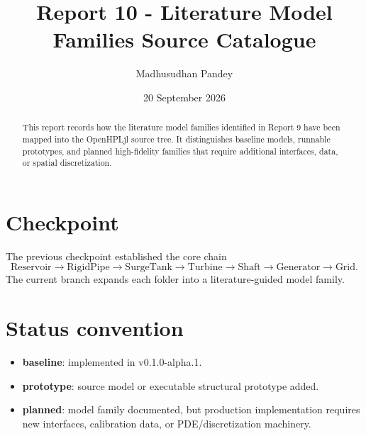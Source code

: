 \documentclass[10pt,a4paper]{article}
\title{Report 10 - Literature Model Families Source Catalogue}
\author{Madhusudhan Pandey}
\date{20 September 2026}
\begin{document}
\maketitle

\begin{abstract}
This report records how the literature model families identified in Report 9
have been mapped into the OpenHPLjl source tree. It distinguishes baseline
models, runnable prototypes, and planned high-fidelity families that require
additional interfaces, data, or spatial discretization.
\end{abstract}

\section{Checkpoint}
The previous checkpoint established the core chain
\[
\text{Reservoir}\rightarrow\text{RigidPipe}\rightarrow\text{SurgeTank}
\rightarrow\text{Turbine}\rightarrow\text{Shaft}\rightarrow\text{Generator}
\rightarrow\text{Grid}.
\]
The current branch expands each folder into a literature-guided model family.

\section{Status convention}
\begin{itemize}
\item \textbf{baseline}: implemented in v0.1.0-alpha.1.
\item \textbf{prototype}: source model or executable structural prototype added.
\item \textbf{planned}: model family documented, but production implementation
requires new interfaces, calibration data, or PDE/discretization machinery.
\end{itemize}
\end{document}
